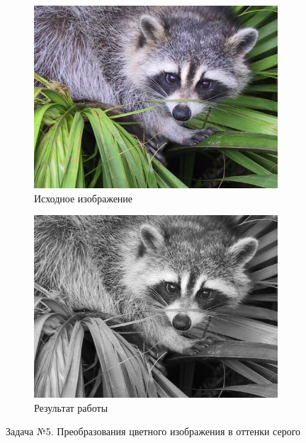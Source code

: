 \documentclass{article}
\begin{document}
\begin{figure}[h]
\begin{center}
\begin{subfigure}{0.46\textwidth}
    \includegraphics[width=\textwidth]{./pics/color.png}
    \caption{Исходное изображение}
\end{subfigure}
\qquad
\begin{subfigure}{0.46\textwidth}
    \includegraphics[width=\textwidth]{./pics/gray.png}
    \caption{Результат работы}
\end{subfigure}
\caption{Задача №5. Преобразования цветного изображения в оттенки серого}
\label{pic:task5}
\end{center}
\end{figure}
\end{document}
